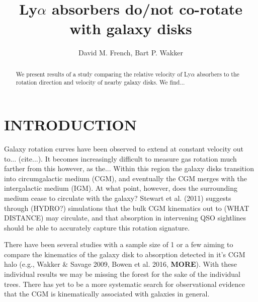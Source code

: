 \documentclass[iop]{emulateapj-rtx4}
\begin{document}
\title{Ly$\alpha$ absorbers do/not co-rotate with galaxy disks}

\author{David M. French, Bart P. Wakker}


\begin{abstract}

We present results of a study comparing the relative velocity of Ly$\alpha$ absorbers to the rotation direction and velocity of nearby galaxy disks. We find...

\end{abstract}




\section{INTRODUCTION}
Galaxy rotation curves have been observed to extend at constant velocity out to... (cite...). It becomes increasingly difficult to measure gas rotation much farther from this however, as the... Within this region the galaxy disks transition into circumgalactic medium (CGM), and eventually the CGM merges with the intergalactic medium (IGM). At what point, however, does the surrounding medium cease to circulate with the galaxy? Stewart et al. (2011) suggests through (HYDRO?) simulations that the bulk CGM kinematics out to (WHAT DISTANCE) may circulate, and that absorption in intervening QSO sightlines should be able to accurately capture this rotation signature.

There have been several studies with a sample size of 1 or a few aiming to compare the kinematics of the galaxy disk to absorption detected in it's CGM halo (e.g., Wakker \& Savage 2009, Bowen et al. 2016, \textbf{MORE}). With these individual results we may be missing the forest for the sake of the individual trees. There has yet to be a more systematic search for observational evidence that the CGM is kinematically associated with galaxies in general.
\end{document}
